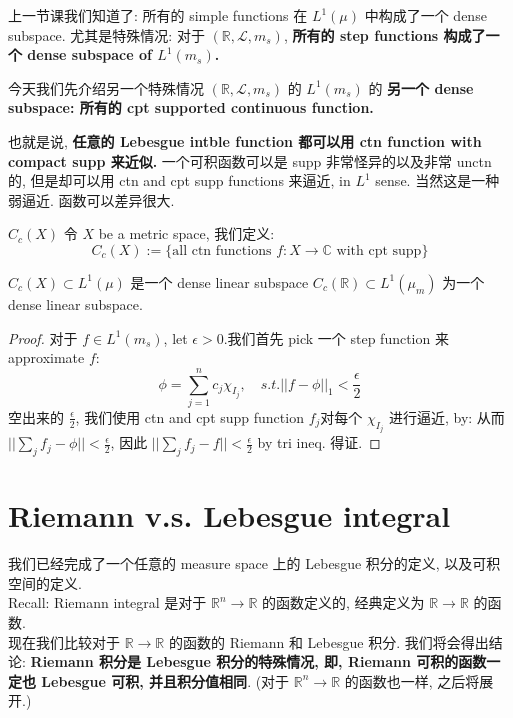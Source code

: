 \documentclass[lang=cn,11pt]{elegantbook}
\begin{document}
上一节课我们知道了: 所有的 simple functions 在 $L^1(\mu)$ 中构成了一个 dense subspace. 尤其是特殊情况: 对于 $(\mathbb{R}, \mathcal{L}, m_s)$, \textbf{所有的 step functions 构成了一个 dense subspace of $L^1(m_s)$. }

今天我们先介绍另一个特殊情况 $(\mathbb{R}, \mathcal{L}, m_s)$ 的 $L^1(m_s)$ 的 \textbf{另一个 dense subspace: 所有的 cpt supported continuous function. }

也就是说, \textbf{任意的 Lebesgue intble function 都可以用 ctn function with compact supp 来近似. } 一个可积函数可以是 supp 非常怪异的以及非常 unctn 的, 但是却可以用 ctn and cpt supp functions 来逼近, in $L^1$ sense. 当然这是一种弱逼近. 函数可以差异很大.

\begin{definition}{$C_c (X)$}
令 $X$ be a metric space, 我们定义:
\[
C_c(X) := \{\text{all ctn functions }f:X \to \mathbb{C}  \text{ with cpt supp}  \}
\]
\end{definition}

\begin{theorem}{$C_c(X) \subset L^1(\mu)$ 是一个 dense linear subspace}
$C_c(\mathbb{R}) \subset L^1(\mu_m)$ 为一个 dense linear subspace.
\end{theorem}
\begin{proof}
对于 $f \in L^1(m_s)$, let $\epsilon > 0$.我们首先 pick 一个 step function 来approximate $f$:   \[
\phi = \sum_{j=1}^n c_j \chi_{I_j} , \quad  s.t. ||f-\phi||_1 < \frac{\epsilon}{2}
\]
空出来的 $\frac{\epsilon}{2}$, 我们使用 ctn and cpt supp function $f_j$对每个 $\chi_{I_j}$ 进行逼近, by:
从而 $||\sum_j f_j  - \phi|| < \frac{\epsilon}{2}$, 因此 $||\sum_j f_j  - f|| < \frac{\epsilon}{2}$ by tri ineq. 得证.
\end{proof}






\section{Riemann v.s. Lebesgue integral}
我们已经完成了一个任意的 measure space 上的 Lebesgue 积分的定义, 以及可积空间的定义.\\
Recall: Riemann integral 是对于 $\mathbb{R}^n \rightarrow \mathbb{R}$ 的函数定义的, 经典定义为 $\mathbb{R} \to \mathbb{R}$ 的函数.\\
现在我们比较对于 $\mathbb{R} \to \mathbb{R}$ 的函数的 Riemann 和 Lebesgue 积分. 我们将会得出结论: \textbf{Riemann 积分是 Lebesgue 积分的特殊情况, 即, Riemann 可积的函数一定也 Lebesgue 可积, 并且积分值相同}. (对于 $\mathbb{R}^n \rightarrow \mathbb{ R}$ 的函数也一样, 之后将展开.)\\
\end{document}
